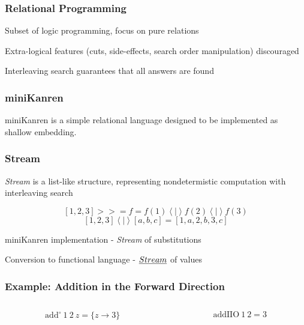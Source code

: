 \documentclass[xcolor=table, aspectratio=169]{beamer}
\begin{document}
\begin{frame}[fragile]
  \frametitle{Relational Programming}

    \begin{center}
        Subset of logic programming, focus on pure relations
    \end{center}
    \vfill
    \begin{center}
        Extra-logical features (cuts, side-effects, search order manipulation) discouraged
    \end{center}
    \vfill
    \begin{center}
        Interleaving search guarantees that all answers are found
    \end{center}
\end{frame}

\begin{frame}[fragile]
  \frametitle{miniKanren}
    \begin{center}
        miniKanren is a simple relational language designed to be implemented as shallow embedding.
    \end{center}
    
\end{frame}

\begin{frame}[fragile]
    \frametitle{Stream}
    \begin{center}
        \emph{Stream} is a list-like structure, representing nondetermistic computation with interleaving search
    \end{center}
    \begin{center}
        \[ \left[1, 2, 3\right] >>= f = f(1) \left<\mid\right> f(2) \left<\mid\right> f(3)\] 
        \[ \left[1, 2, 3\right] \left<\mid\right> \left[a, b, c\right] = \left[1, a, 2, b, 3, c\right] \] 
    \end{center}

    \begin{center}
        miniKanren implementation - \emph{Stream} of substitutions

        Conversion to functional language - $\emph{Stream}$ of values
    \end{center}
\end{frame}

\begin{frame}[fragile]
  \frametitle{Example: Addition in the Forward Direction}
\begin{columns}
  \begin{column}[t]{0.49\textwidth}
    
    \[ \text{add}^{\circ}\ 1\ 2\ z = \{z \to 3\}\]
  \end{column}
  \begin{column}[t]{0.49\textwidth}
    
    \[ \text{addIIO}\ 1\ 2 = 3 \] 
  \end{column}
\end{columns}
\end{frame}
\end{document}
